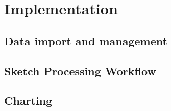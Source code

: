 \chapter{Implementation}
	\section{Data import and management}
	\section{Sketch Processing Workflow}
	\section{Charting}
	